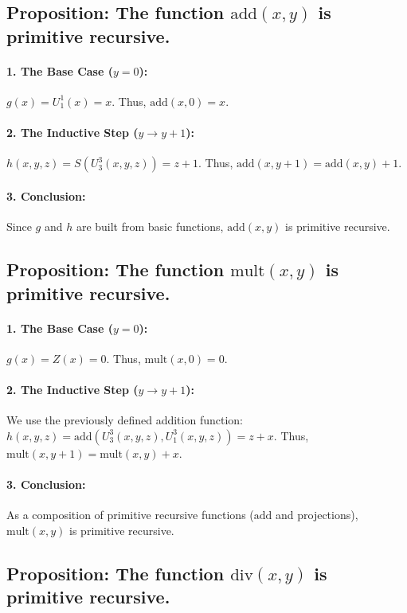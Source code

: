 \documentclass{article}
\begin{document}
\subsection*{Proposition: The function $\text{add}(x,y)$ is primitive recursive.} 

\paragraph{1. The Base Case ($y=0$):}
$g(x) = U_1^1(x) = x$. Thus, $\text{add}(x,0) = x$.

\paragraph{2. The Inductive Step ($y \to y+1$):}
$h(x, y, z) = S(U_3^3(x, y, z)) = z + 1$.
Thus, $\text{add}(x, y+1) = \text{add}(x, y) + 1$.

\paragraph{3. Conclusion:}
Since $g$ and $h$ are built from basic functions, $\text{add}(x,y)$ is primitive recursive.

\subsection*{Proposition: The function $\text{mult}(x,y)$ is primitive recursive.} 

\paragraph{1. The Base Case ($y=0$):}
$g(x) = Z(x) = 0$. Thus, $\text{mult}(x,0) = 0$.

\paragraph{2. The Inductive Step ($y\to y+1$):}
We use the previously defined addition function:
$h(x, y, z) = \text{add}(U_3^3(x, y, z), U_1^3(x, y, z)) = z + x$.
Thus, $\text{mult}(x, y+1) = \text{mult}(x, y) + x$.

\paragraph{3. Conclusion:}
As a composition of primitive recursive functions ($\text{add}$ and projections), $\text{mult}(x,y)$ is primitive recursive.

\subsection*{Proposition: The function $\text{div}(x,y)$ is primitive recursive.}
\end{document}
